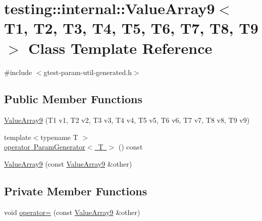 \hypertarget{classtesting_1_1internal_1_1_value_array9}{}\section{testing\+::internal\+::Value\+Array9$<$ T1, T2, T3, T4, T5, T6, T7, T8, T9 $>$ Class Template Reference}
\label{classtesting_1_1internal_1_1_value_array9}


{\ttfamily \#include $<$gtest-\/param-\/util-\/generated.\+h$>$}

\subsection*{Public Member Functions}
\begin{DoxyCompactItemize}
\item 
\mbox{\hyperlink{classtesting_1_1internal_1_1_value_array9_a4985545b509dc5d7db659cd31b110c21}{Value\+Array9}} (T1 v1, T2 v2, T3 v3, T4 v4, T5 v5, T6 v6, T7 v7, T8 v8, T9 v9)
\item 
{\footnotesize template$<$typename T $>$ }\\\mbox{\hyperlink{classtesting_1_1internal_1_1_value_array9_aede7e5849cfab0504c49673d5c5c4cce}{operator Param\+Generator$<$ T $>$}} () const
\item 
\mbox{\hyperlink{classtesting_1_1internal_1_1_value_array9_ab251d9c7a0df5c8034ecda38eadd030a}{Value\+Array9}} (const \mbox{\hyperlink{classtesting_1_1internal_1_1_value_array9}{Value\+Array9}} \&other)
\end{DoxyCompactItemize}
\subsection*{Private Member Functions}
\begin{DoxyCompactItemize}
\item 
void \mbox{\hyperlink{classtesting_1_1internal_1_1_value_array9_a6c811bfffbd5624d7d890c71edac4d27}{operator=}} (const \mbox{\hyperlink{classtesting_1_1internal_1_1_value_array9}{Value\+Array9}} \&other)
\end{DoxyCompactItemize}
